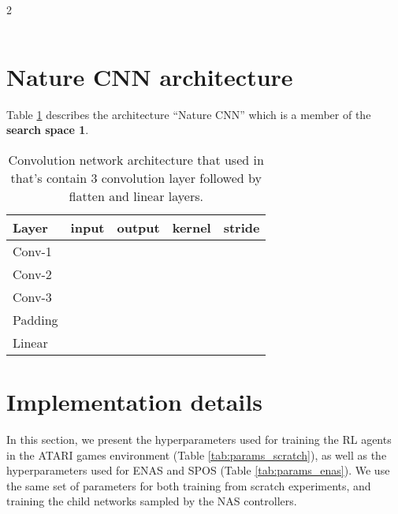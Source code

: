 \documentclass{svproc}
\begin{document}
\begin{appendix}
\begin{table*}[!h]
\begin{multicols}{2}
\begin{center}
\begin{tabularx}{0.5\textwidth}{@{}lcccc@{}}
    \end{tabularx}
    \end{center}
\end{multicols}
\caption{Detailed description of the search spaces.}
\label{search_spaces_table}
\end{table*}


\section{Nature CNN architecture}
\label{app:nature-CNN-architecture}
Table \ref{tab:nature-cnn} describes the architecture ``Nature CNN'' \cite{Humanlevel2015} which is a member of the  \textbf{search space 1}.
\begin{table}[!h]
\begin{center}
\begin{tabularx}{0.5\textwidth}{@{}lcccc@{}}
    \hline
    \textbf{Layer} & \textbf{input} & \textbf{output} & \textbf{kernel} & \textbf{stride}\\
    \hline
        Conv-1 &  &  &  &          \\
        Conv-2 &  &  &  &         \\
        Conv-3 &  &  &  &         \\
        Padding &  &  &  &     \\
        Linear &  &  &  &    \\
    \hline
\end{tabularx}
\caption{Convolution network architecture that used in \cite{Humanlevel2015} that's contain 3 convolution layer followed by flatten and linear layers.}\label{tab:nature-cnn}
\end{center}
\end{table}

\section{Implementation details}
\label{app:hyperparams}
In this section, we present the hyperparameters used for training the RL agents in the ATARI games environment (Table \ref{tab:params_scratch}), as well as the hyperparameters used for ENAS and SPOS (Table \ref{tab:params_enas}).
We use the same set of parameters for both training from scratch experiments, and training the child networks sampled by the NAS controllers.


\end{appendix}
\end{document}
